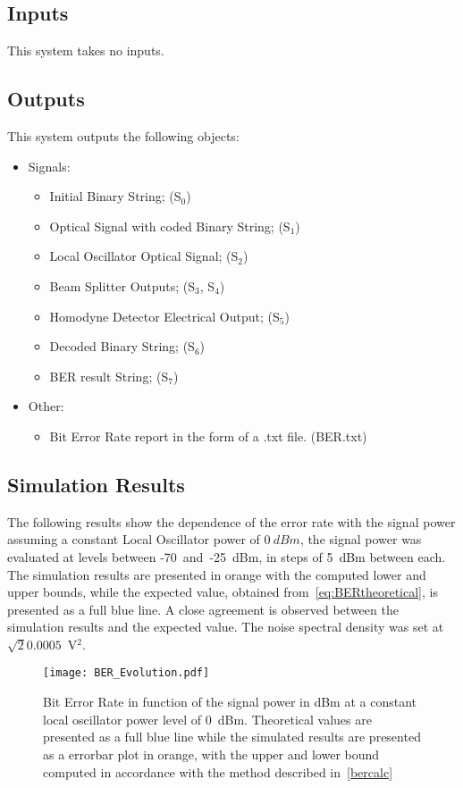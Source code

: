\subsection*{Inputs}

This system takes no inputs.

\subsection*{Outputs}

This system outputs the following objects:
\begin{itemize}
\item Signals:
\begin{itemize}
\item Initial Binary String; (S$_0$)
\item Optical Signal with coded Binary String; (S$_{1}$)
\item Local Oscillator Optical Signal; (S$_{2}$)
\item Beam Splitter Outputs; (S$_{3}$, S$_{4}$)
\item Homodyne Detector Electrical Output; (S$_{5}$)
\item Decoded Binary String; (S$_{6}$)
\item BER result String; (S$_{7}$)
\end{itemize}
\item Other:
\begin{itemize}
\item Bit Error Rate report in the form of a .txt file. (BER.txt)
\end{itemize}
\end{itemize}

\subsection*{Simulation Results}

The following results show the dependence of the error rate with the signal power assuming a constant Local Oscillator power of $0~dBm$, the signal power was evaluated at levels between -70~and~-25~dBm, in steps of 5~dBm between each. The simulation results are presented in orange with the computed lower and upper bounds, while the expected value, obtained from~\eqref{eq:BERtheoretical}, is presented as a full blue line. A close agreement is observed between the simulation results and the expected value. The noise spectral density was set at $\sqrt{2}0.0005$~V$^2$. 
\begin{figure}[H]
\centering
\texttt{[image: BER\_Evolution.pdf]}
\caption{Bit Error Rate in function of the signal power in dBm at a constant local oscillator power level of 0~dBm. Theoretical values are presented as a full blue line while the simulated results are presented as a errorbar plot in orange, with the upper and lower bound computed in accordance with the method described in~\ref{bercalc}}
\label{fig:berevolution}
\end{figure}
